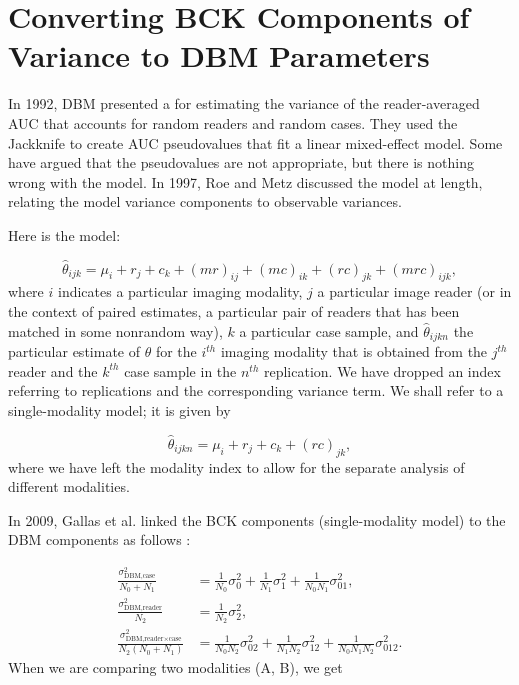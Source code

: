 \documentclass{article}%
\begin{document}
\appendix{}

\section{Converting BCK Components of Variance to DBM Parameters}

In 1992, DBM presented a for estimating the variance of the reader-averaged
AUC that accounts for random readers and random cases. They used the Jackknife
to create AUC pseudovalues that fit a linear mixed-effect model. Some have
argued that the pseudovalues are not appropriate, but there is nothing wrong
with the model. In 1997, Roe and Metz discussed the model at length, relating
the model variance components to observable variances.

Here is the model:%

\begin{equation}
\widehat{\theta}_{ijk}=\mu_{i}+r_{j}+c_{k}+\left(  mr\right)  _{ij}+\left(
mc\right)  _{ik}+\left(  rc\right)  _{jk}+\left(  mrc\right)  _{ijk},
\end{equation}
where $i$ indicates a particular imaging modality, $j$ a particular image
reader (or in the context of paired estimates, a particular pair of readers
that has been matched in some nonrandom way), $k$ a particular case sample,
and $\widehat{\theta}_{ijkn}$ the particular estimate of $\theta$ for the
$i^{th}$ imaging modality that is obtained from the $j^{th}$ reader and the
$k^{th}$ case sample in the $n^{th}$ replication. We have dropped an index
referring to replications and the corresponding variance term. We shall refer
to a single-modality model; it is given by%

\begin{equation}
\widehat{\theta}_{ijkn}=\mu_{i}+r_{j}+c_{k}+\left(  rc\right)  _{jk},
\end{equation}
where we have left the modality index to allow for the separate analysis of
different modalities.

In 2009, Gallas et al. linked the BCK components (single-modality model) to
the DBM components as follows \cite{Gallas2009_Commun-Stat-A-Theor_v38p2586}:%

\begin{align}
\frac{\sigma_{\text{DBM,case}}^{2}}{N_{0}+N_{1}}  &  =\frac{1}{N_{0}}%
\sigma_{0}^{2}+\frac{1}{N_{1}}\sigma_{1}^{2}+\frac{1}{N_{0}N_{1}}\sigma
_{01}^{2},\\
\frac{\sigma_{\text{DBM,reader}}^{2}}{N_{2}}  &  =\frac{1}{N_{2}}\sigma
_{2}^{2},\\
\frac{\sigma_{\text{DBM,reader}\times\text{case}}^{2}}{N_{2}\left(
N_{0}+N_{1}\right)  }  &  =\frac{1}{N_{0}N_{2}}\sigma_{02}^{2}+\frac{1}%
{N_{1}N_{2}}\sigma_{12}^{2}+\frac{1}{N_{0}N_{1}N_{2}}\sigma_{012}^{2}.
\end{align}
When we are comparing two modalities (A, B), we get%
\end{document}
